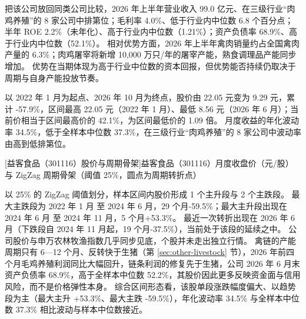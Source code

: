  把该公司放回同类公司比较，2026 年上半年营业收入 99.0 亿元、在三级行业“肉鸡养殖”的 8 家公司中排第位；毛利率 4.0\%、低于行业内中位数 6.8 个百分点；半年 ROE 2.2\%（未年化）、高于行业内中位数（1.21\%）；资产负债率 68.9\%、高于行业内中位数（52.1\%）。 相对优势方面，2026 年上半年禽肉销量约占全国禽肉产量的 6.3\%；肉鸡屠宰将新增 10,000 万只/年的屠宰产能，熟食调理品产能同步增加。 优势在当期体现为高于行业中位数的资本回报，但优势能否持续仍取决于周期与自身产能投放节奏。

 以 2022 年 1 月为起点、2026 年 10 月为终点，股价由 22.05 元变为 9.29 元，累计 -57.9\%，区间最高 22.05 元（2022 年 1 月）、最低 8.56 元（2026 年 6 月）；当前价相当于区间最高价的 42.1\%，为区间最低价的 1.09 倍。 月度收益的年化波动率 34.5\%，低于全样本中位数 37.3\%，在三级行业“肉鸡养殖”的 8 家公司中波动率由高到低排第位。

\begin{center}
\begin{minipage}{\textwidth}\centering
{}

[益客食品（301116）股价与周期骨架]{益客食品（301116）月度收盘价（元/股）与 ZigZag 周期骨架（阈值 25\%，圆点为周期转折点）}
\end{minipage}
\end{center}

 以 25\% 的 ZigZag 阈值划分，样本区间内股价形成 1 个主升段与 2 个主跌段。 最大主跌段为 2022 年 1 月 至 2024 年 6 月，29 个月-59.5\%；最大主升段出现在 2024 年 6 月 至 2024 年 11 月，5 个月+53.3\%。 最近一次转折出现在 2026 年 6 月（下跌段自 2024 年 11 月起，19 个月-37.5\%），当前处于该段的延续之中。 公司股价与申万农林牧渔指数几乎同步见底，个股并未走出独立行情。 禽链的产能周期只有 6---12 个月、反转快于生猪（第 \ref{sec:other-livestock} 节），2026 年前四个月毛鸡养殖利润同比大幅回升，链条利润的修复先于生猪，公司 2026 年 6 月末资产负债率 68.9\%，高于全样本中位数 52.2\%，其股价因此更多反映资金面与信用风险，而不是价格弹性本身。 综合区间形态看，该股单段涨跌幅度偏大、以趋势段为主（最大主升 +53.3\%、最大主跌 -59.5\%），年化波动率 34.5\% 与全样本中位数 37.3\% 相比波动与样本中位数接近。

